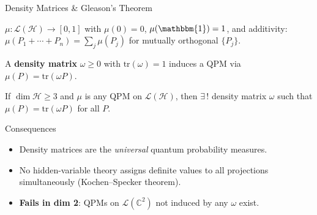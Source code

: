 \documentclass{beamer}
\newcommand{\Hilb}{\mathcal{H}}
\newcommand{\tr}{\mathrm{tr}}
\begin{document}
\begin{frame}[shrink=10]{Density Matrices \& Gleason's Theorem}
  \small
  \begin{tcolorbox}[defbox, title={Quantum Probability Measure (QPM)}, left=3pt, right=3pt, top=2pt, bottom=2pt]
    $\mu:\mathcal{L}(\Hilb)\to[0,1]$ with $\mu(0)=0$, $\mu(\mathbbm{1})=1$, and
    additivity:\\
    $\mu(P_1+\cdots+P_n)=\sum_j\mu(P_j)$ for mutually orthogonal $\{P_j\}$.
  \end{tcolorbox}

  A \textbf{density matrix} $\omega\ge 0$ with $\tr(\omega)=1$ induces a QPM via
  $\mu(P)=\tr(\omega P)$.

  \begin{tcolorbox}[thmbox={Gleason's Theorem (1957)}, left=3pt, right=3pt, top=2pt, bottom=2pt]
    If $\dim\Hilb\ge 3$ and $\mu$ is any QPM on $\mathcal{L}(\Hilb)$, then $\exists\,!$
    density matrix $\omega$ such that $\mu(P)=\tr(\omega P)$ for all $P$.
  \end{tcolorbox}

  \begin{alertblock}{Consequences}
    \begin{itemize}\setlength\itemsep{1pt}
      \item Density matrices are the \emph{universal} quantum probability measures.
      \item No hidden-variable theory assigns definite values to all projections
        simultaneously (Kochen--Specker theorem).
      \item \textbf{Fails in dim 2}: QPMs on $\mathcal{L}(\mathbb{C}^2)$ not induced by any $\omega$ exist.
    \end{itemize}
  \end{alertblock}
\end{frame}
\end{document}
